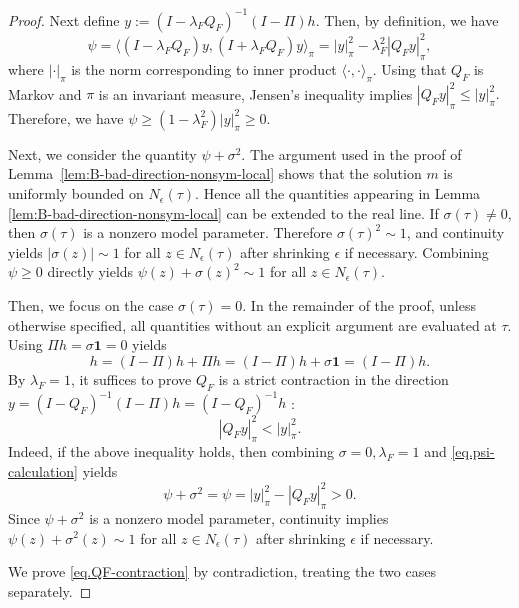 \documentclass[11pt,twoside, a4paper]{article}
\numberwithin{equation}{section}
\numberwithin{figure}{section}
\theoremstyle{plain} %
\theoremstyle{definition}
\theoremstyle{remark}
\newcommand{\1} {\mspace{1 mu}}
\newcommand{\2} {\mspace{2 mu}}
\begin{document}
\begin{proof}
  Next define
  $
  y:=(I-\lambda_F Q_F)^{-1}(I-\Pi)h.
  $
  Then, by definition, we have
  \begin{equation}\label{eq.psi-calculation}
    \psi
  =
  \langle (I-\lambda_F Q_F)y,(I+\lambda_F Q_F)y\rangle_\pi
  =
  |y|_\pi^2-\lambda_F^2|Q_Fy|_\pi^2 ,
  \end{equation}
  where $|\cdot|_\pi$ is the norm corresponding to inner product $\langle\cdot,\cdot\rangle_\pi$.
  Using that \(Q_F\) is Markov and \(\pi\) is an invariant measure, Jensen's inequality implies
  $
  |Q_Fy|_\pi^2\le
  |y|_\pi^2.
  $
  Therefore, we have
  $
  \psi\ge (1-\lambda_F^2)|y|_\pi^2\ge 0.
  $

  \medskip
  Next, we consider the quantity $\psi+\sigma^2$. 
  The argument used in the proof of Lemma~\ref{lem:B-bad-direction-nonsym-local} shows that the solution \(m\) is uniformly bounded on \(N_\epsilon(\tau)\).
  Hence all the quantities appearing in Lemma \ref{lem:B-bad-direction-nonsym-local} can be extended to the real line.
  If \(\sigma(\tau)\ne0\), then \(\sigma(\tau)\) is a nonzero model parameter. Therefore \(\sigma(\tau)^2\sim1\), and continuity yields $|\sigma(z)|\sim 1$ for all $z\in N_\epsilon(\tau)$ after shrinking $\epsilon$ if necessary. Combining $\psi\ge 0$ directly yields $\psi(z)+\sigma(z)^2\sim 1$ for all $z\in N_\epsilon(\tau)$.
  
  Then, we focus on the case $\sigma(\tau)=0$. In the remainder of the proof, unless otherwise specified, all quantities without an explicit argument are evaluated at \(\tau\).
  Using $\Pi h=\sigma \mathbf{1}=0$ yields 
  \[
      h=(I-\Pi)h+\Pi h=(I-\Pi)h+\sigma\mathbf{1}=(I-\Pi)h.
  \]  
  By $\lambda_F=1$, it suffices to prove $Q_F$ is a strict contraction in the direction $y=(I-Q_F)^{-1}(I-\Pi)h=(I-Q_F)^{-1}h$ :
  \begin{equation}\label{eq.QF-contraction}
    |Q_Fy|_\pi^2< |y|_\pi^2.
  \end{equation}
  Indeed, if the above inequality holds, then combining $\sigma=0, \lambda_F=1$ and \eqref{eq.psi-calculation} yields
  \[
      \psi+\sigma^2=\psi= |y|_\pi^2-|Q_Fy|_\pi^2>0.
  \]
  Since $\psi+\sigma^2$ is a nonzero model parameter, continuity implies $\psi(z)+\sigma^2(z)\sim 1$ for all $z\in N_\epsilon(\tau)$ after shrinking $\epsilon$ if necessary.

  We prove \eqref{eq.QF-contraction} by contradiction, treating the two cases separately.
  

\end{proof}
\end{document}
